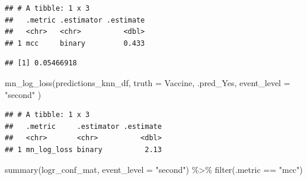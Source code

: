\documentclass[
]{article}
\newenvironment{Shaded}{\begin{snugshade}}{\end{snugshade}}
\newcommand{\AttributeTok}[1]{\textcolor[rgb]{0.77,0.63,0.00}{#1}}
\newcommand{\DecValTok}[1]{\textcolor[rgb]{0.00,0.00,0.81}{#1}}
\newcommand{\FunctionTok}[1]{\textcolor[rgb]{0.00,0.00,0.00}{#1}}
\newcommand{\NormalTok}[1]{#1}
\newcommand{\OtherTok}[1]{\textcolor[rgb]{0.56,0.35,0.01}{#1}}
\newcommand{\SpecialCharTok}[1]{\textcolor[rgb]{0.00,0.00,0.00}{#1}}
\newcommand{\StringTok}[1]{\textcolor[rgb]{0.31,0.60,0.02}{#1}}
\begin{document}
\begin{verbatim}
## # A tibble: 1 x 3
##   .metric .estimator .estimate
##   <chr>   <chr>          <dbl>
## 1 mcc     binary         0.433
\end{verbatim}

\begin{Shaded}
\end{Shaded}

\begin{verbatim}
## [1] 0.05466918
\end{verbatim}

\begin{Shaded}
\begin{Highlighting}[]
\FunctionTok{mn\_log\_loss}\NormalTok{(predictions\_knn\_df,}
            \AttributeTok{truth =}\NormalTok{ Vaccine,}
\NormalTok{            .pred\_Yes,}
            \AttributeTok{event\_level =} \StringTok{"second"}
\NormalTok{)}
\end{Highlighting}
\end{Shaded}

\begin{verbatim}
## # A tibble: 1 x 3
##   .metric     .estimator .estimate
##   <chr>       <chr>          <dbl>
## 1 mn_log_loss binary          2.13
\end{verbatim}

\begin{Shaded}
\begin{Highlighting}[]
\FunctionTok{summary}\NormalTok{(logr\_conf\_mat, }\AttributeTok{event\_level =} \StringTok{"second"}\NormalTok{) }\SpecialCharTok{\%\textgreater{}\%} \FunctionTok{filter}\NormalTok{(.metric }\SpecialCharTok{==} \StringTok{"mcc"}\NormalTok{)}
\end{Highlighting}
\end{Shaded}
\end{document}
